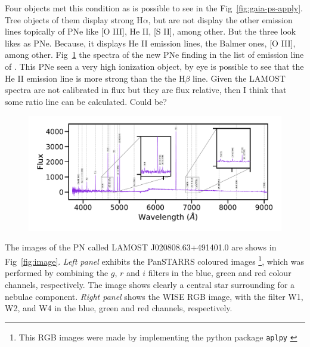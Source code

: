 \documentclass{article}
\newcommand\ha{\ensuremath{\mathrm{H\alpha}}}
\begin{document}
Four objects met this  condition as is possible to see in the Fig~\ref{fig:gaia-ps-apply}.
Tree objects of them display strong \ha{}, but are not display the other emission lines topically
of PNe like [O III], He II, [S II], among other. But the three look likes as PNe.
Because, it displays He II emission lines, the Balmer ones, [O III], among other.
Fig~\ref{fig:spectra} the spectra of the new PNe finding in the list of emission line of
\citet{Skoda:2020}. This PNe seen a very high ionization object, by eye is possible to see
that the He II emission line is more strong than the the H$\beta$ line. Given the LAMOST spectra
are not calibrated in flux but they are flux relative, then I think that some ratio line can be calculated. Could be?

\begin{figure}
\centering
  \includegraphics[width=0.9\linewidth]{../Spectra-lamostdr7/spec-56581-VB031N50V1_sp08-218.pdf}
  \caption{} 
  \label{fig:spectra}
\end{figure}

The images of the PN called LAMOST J020808.63+491401.0 are shows in Fig~\ref{fig:image}.  \textit{Left panel} exhibits the PanSTARRS coloured images \footnote{This RGB images were made by implementing the python package \texttt{aplpy} \citep{aplpy:2019}}, which was performed by combining the $g$, $r$ and $i$ filters in the blue, green and red colour channels, respectively. The image shows clearly a central star surrounding for a nebulae component. \textit{Right panel} shows the WISE RGB image, with the filter W1, W2, and W4 in the blue, green and red channels, respectively.  
\end{document}
